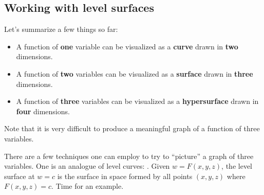 \documentclass{ximera}
\begin{document}


\subsection{Working with level surfaces}
Let's summarize a few things so far:

\begin{itemize}
  \item A function of \textbf{one} variable can be visualized as a \textbf{curve} drawn
    in \textbf{two} dimensions.
  \item A function of \textbf{two} variables can be visualized as a \textbf{surface}
    drawn in \textbf{three} dimensions.
  \item A function of \textbf{three} variables can be visualized as a
    \textbf{hypersurface} drawn in \textbf{four} dimensions.
\end{itemize}

Note that it is very difficult to produce a meaningful graph of a function of
three variables.

There are a few techniques one can employ to try to ``picture'' a
graph of three variables. One is an analogue of level curves:
. Given $w=F(x,y,z)$, the level surface at $w=c$
is the surface in space formed by all points $(x,y,z)$ where
$F(x,y,z)=c$. Time for an example.
\end{document}
